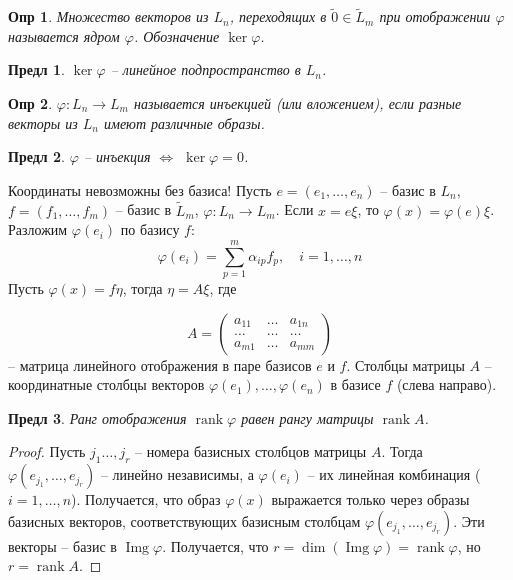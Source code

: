 \documentclass[a4paper,12pt]{article}
\DeclareMathOperator{\img}{\mathop{Img}}
\DeclareMathOperator{\rank}{\mathop{rank}}
\newtheorem*{definition}{Опр}
\newtheorem{propos}{Предл}[section]
\begin{document}
\begin{definition}
	Множество векторов из $L_n$, переходящих в $\tilde{0} \in \tilde{L}_m$ при отображении $\varphi$ называется ядром $\varphi$. Обозначение $\ker \varphi$.
\end{definition}

\begin{propos}
	$\ker \varphi$  -- линейное подпространство в $L_n$.
\end{propos}

\begin{definition}
	$\varphi: L_n \to L_m$ называется инъекцией (или вложением), если разные векторы из $L_n$ имеют различные образы.
\end{definition}

\begin{propos}
	$\varphi$ -- инъекция $ \Leftrightarrow$ $\ker \varphi = 0$.
\end{propos}

Координаты невозможны без базиса! Пусть $e = (e_1, \ldots, e_n)$ -- базис в $L_n$, $f = (f_1, \ldots, f_m)$ -- базис в $\tilde{L}_m$, $\varphi: L_n \to L_m$. Если $x = e\xi$, то $\varphi(x) = \varphi(e)\xi$. Разложим $\varphi(e_i)$ по базису $f$:
\[
	\varphi(e_i) = \sum_{p = 1}^{m} \alpha_{ip} f_p, \quad i = 1, \ldots, n
\]
Пусть $\varphi(x) = f \eta$, тогда $\eta = A \xi$, где 

\[
A = \begin{pmatrix}
		a_{11} & \ldots & a_{1n} \\
		\ldots & \ldots & \ldots \\
		a_{m1} & \ldots & a_{mm}
	\end{pmatrix}
\] 
-- матрица линейного отображения в паре базисов $e$ и $f$. Столбцы матрицы $A$ -- координатные столбцы векторов $\varphi(e_1), \ldots, \varphi(e_n)$ в базисе $f$ (слева направо).

\begin{propos}
	Ранг отображения $\rank \varphi$ равен рангу матрицы $\rank A$.
\end{propos}
\begin{proof}
	Пусть $j_1 \ldots, j_r$ -- номера базисных столбцов матрицы $A$. Тогда $\varphi(e_{j_1}, \ldots, e_{j_r})$ -- линейно независимы, а $\varphi(e_i)$ -- их линейная комбинация ($i = 1, \ldots, n$). Получается, что образ $\varphi(x)$ выражается только через образы базисных векторов, соответствующих базисным столбцам $\varphi(e_{j_1}, \ldots, e_{j_r})$. Эти векторы -- базис в $\img \varphi$. Получается, что $r = \dim(\img \varphi) = \rank \varphi$, но $r = \rank A$.
\end{proof}
\end{document}
